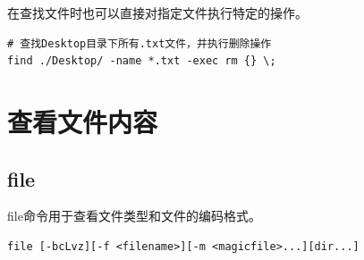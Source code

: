 \documentclass[12pt, openany, oneside]{book}
\begin{document}
\begin{enumerate}
	      在查找文件时也可以直接对指定文件执行特定的操作。
	      \vspace{-0.5cm}
	      \begin{lstlisting}
# 查找Desktop目录下所有.txt文件，并执行删除操作
find ./Desktop/ -name *.txt -exec rm {} \;
            \end{lstlisting}
\end{enumerate}

\newpage

\section{查看文件内容}

\subsection{file}

file命令用于查看文件类型和文件的编码格式。

\vspace{-0.5cm}
\begin{lstlisting}
file [-bcLvz][-f <filename>][-m <magicfile>...][dir...]
\end{lstlisting}

\begin{table}[H]
	\centering
	\caption{file参数说明}
\end{table}
\end{document}

